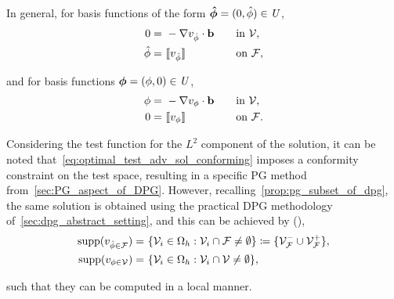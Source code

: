 In general, for basis functions of the form $\mathit{\bm{{\hat{\phi}}}} = (0,\hat{\phi}) \in \mathit{{{U}}}$,
\begin{alignat}{3}
0 =\ & -\nabla v_{\hat{\phi}} \cdot \vect{b}\quad && \text{in}\ \fe{V}, \label{eq:optimal_test_adv_trace_0} \\
\hat{\phi} =\ & \jump{v_{\hat{\phi}}} && \text{on}\ \fe{F},
\label{eq:optimal_test_adv_trace_1}
\end{alignat}

and for basis functions $\mathit{\bm{{\phi}}} = (\phi,0) \in \mathit{{{U}}}$,
\begin{alignat}{3}
\phi =\ & -\nabla v_{\phi} \cdot \vect{b}\quad && \text{in}\ \fe{V}, \label{eq:optimal_test_adv_sol} \\
0 =\ & \jump{v_{\phi}} && \text{on}\ \fe{F}.
\label{eq:optimal_test_adv_sol_conforming}
\end{alignat}

Considering the test function for the $L^2$ component of the solution, it can be noted
that~\eqref{eq:optimal_test_adv_sol_conforming} imposes a conformity constraint on the test space, resulting in a
specific PG method from~\autoref{sec:PG_aspect_of_DPG}. However, recalling~\autoref{prop:pg_subset_of_dpg}, the same
solution is obtained using the practical DPG methodology of~\autoref{sec:dpg_abstract_setting}, and this can be achieved
by 
(),
\begin{align}
{\text{supp}(v_{\hat{\phi} \in \mathcal{{{F}}}})}
=\ & \{ \mathcal{{{V}}}_i \in \Omega_h : \mathcal{{{V}}}_i \cap \mathcal{{{F}}} \ne \emptyset \}
\coloneqq \{ \mathcal{{{V}}}_{\mathcal{{{F}}}}^- \cup \mathcal{{{V}}}_{\mathcal{{{F}}}}^+ \}, \\
{\text{supp}(v_{\phi \in \mathcal{{{V}}}})} =\ & \{ \mathcal{{{V}}}_i \in \Omega_h : \mathcal{{{V}}}_i \cap \mathcal{{{V}}} \ne \emptyset \},
\end{align}

such that they can be computed in a local manner.

